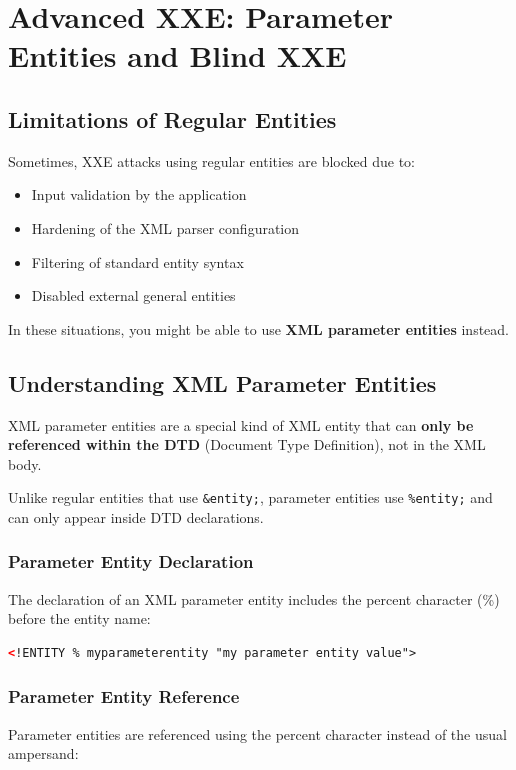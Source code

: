 \documentclass{article}
\begin{document}
\section{Advanced XXE: Parameter Entities and Blind XXE}

\subsection{Limitations of Regular Entities}
Sometimes, XXE attacks using regular entities are blocked due to:
\begin{itemize}
    \item Input validation by the application
    \item Hardening of the XML parser configuration
    \item Filtering of standard entity syntax
    \item Disabled external general entities
\end{itemize}

In these situations, you might be able to use \textbf{XML parameter entities} instead.

\subsection{Understanding XML Parameter Entities}

XML parameter entities are a special kind of XML entity that can \textbf{only be referenced within the DTD} (Document Type Definition), not in the XML body.

\begin{infobox}
Unlike regular entities that use \texttt{\&entity;}, parameter entities use \texttt{\%entity;} and can only appear inside DTD declarations.
\end{infobox}

\subsubsection{Parameter Entity Declaration}
The declaration of an XML parameter entity includes the percent character (\%) before the entity name:

\begin{lstlisting}[language=XML]
<!ENTITY % myparameterentity "my parameter entity value">
\end{lstlisting}

\subsubsection{Parameter Entity Reference}
Parameter entities are referenced using the percent character instead of the usual ampersand:
\end{document}
